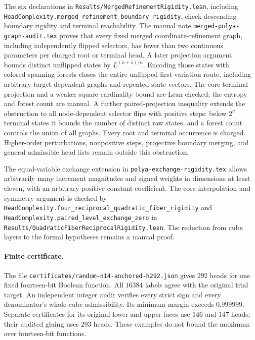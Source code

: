 \documentclass[11pt]{article}
\begin{document}
The six declarations in \texttt{Results/MergedRefinementRigidity.lean},
including \texttt{HeadComplexity.merged\_refinement\_boundary\_rigidity},
check descending boundary rigidity and terminal reachability. The manual
note \texttt{merged-polya-graph-audit.tex} proves that every fixed
merged coordinate-refinement graph, including independently flipped
selectors, has fewer than two continuous parameters per charged root or
terminal head. A later projection argument bounds distinct unflipped states by
$L^{(n+1)/n}$. Encoding those states with colored spanning forests
closes the entire unflipped first-variation route, including arbitrary
target-dependent graphs and repeated state vectors. The core terminal
projection and a weaker square cardinality bound are Lean checked; the
entropy and forest count are manual. A further paired-projection
inequality extends the obstruction to all node-dependent selector flips
with positive steps: below $2^n$ terminal states it bounds the number
of distinct raw states, and a forest count controls the union of all
graphs. Every root and terminal occurrence is charged. Higher-order
perturbations, nonpositive steps, projective boundary merging, and general
admissible head lists remain outside this obstruction.

The equal-variable exchange extension in
\texttt{polya-exchange-rigidity.tex} allows arbitrarily many increment
magnitudes and signed weights in dimensions at least eleven, with an
arbitrary positive constant coefficient. The core
interpolation and symmetry argument is checked by
\texttt{HeadComplexity.four\_reciprocal\_quadratic\_fiber\_rigidity}
and \texttt{HeadComplexity.paired\_level\_exchange\_zero} in
\texttt{Results/QuadraticFiberReciprocalRigidity.lean}. The reduction
from cube layers to the formal hypotheses remains a manual proof.

\paragraph{Finite certificate.}
The file \texttt{certificates/random-n14-anchored-h292.json} gives
$292$ heads for one fixed fourteen-bit Boolean function. All $16384$
labels agree with the original trial target. An independent integer
audit verifies every strict sign and every denominator's whole-cube
admissibility. Its minimum margin exceeds $0.999999$.
Separate certificates for its original lower and upper faces use
$146$ and $147$ heads; their audited gluing uses $293$ heads.
These examples do not bound the maximum over fourteen-bit functions.
\end{document}
